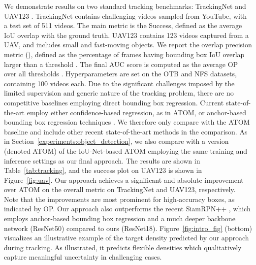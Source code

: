 \documentclass[runningheads]{llncs}
\begin{document}
We demonstrate results on two standard tracking benchmarks: TrackingNet \cite{TrackingNet} and UAV123 \cite{UAV123}. TrackingNet contains challenging videos sampled from YouTube, with a test set of 511 videos. The main metric is the Success, defined as the average IoU overlap with the ground truth. UAV123 contains 123 videos captured from a UAV, and includes small and fast-moving objects. We report the overlap precision metric (), defined as the percentage of frames having bounding box IoU overlap larger than a threshold . The final AUC score is computed as the average OP over all thresholds . Hyperparameters are set on the OTB \cite{OTB2015} and NFS \cite{NfS} datasets, containing 100 videos each. Due to the significant challenges imposed by the limited supervision and generic nature of the tracking problem, there are no competitive baselines employing direct bounding box regression. Current state-of-the-art employ either confidence-based regression, as in ATOM, or anchor-based bounding box regression techniques \cite{DaSiamRPN,SiamRPN++}. We therefore only compare with the ATOM baseline and include other recent state-of-the-art methods in the comparison. As in Section~\ref{experiments:object_detection}, we also compare with a version (denoted ATOM) of the IoU-Net-based ATOM employing the same training and inference settings as our final approach. The results are shown in Table~\ref{tab:tracking}, and the success plot on UAV123 is shown in Figure~\ref{fig:uav}. Our approach achieves a significant  and  absolute improvement over ATOM on the overall metric on TrackingNet and UAV123, respectively. Note that the improvements are most prominent for high-accuracy boxes, as indicated by OP. Our approach also outperforms the recent SiamRPN++ \cite{SiamRPN++}, which employs anchor-based bounding box regression \cite{Ren2015FasterRT,Redmon2016YOLO9000BF} and a much deeper backbone network (ResNet50) compared to ours (ResNet18). Figure~\ref{fig:intro_fig} (bottom) visualizes an illustrative example of the target density  predicted by our approach during tracking. As illustrated, it predicts flexible densities which qualitatively capture meaningful uncertainty in challenging cases.
\end{document}
